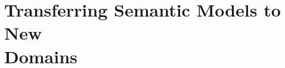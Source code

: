 \graphicspath{{./main/4_chapter01/sections/figures/}}

\chapter[Transferring Semantic Models to New Domains]{Transferring Semantic Models to New\\ Domains}
\label{chap:p2_02}







